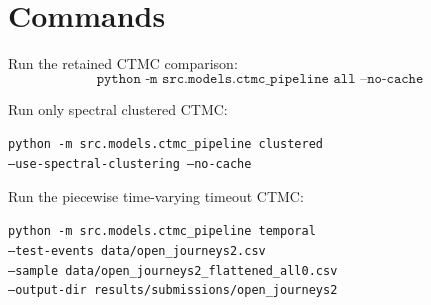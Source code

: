 \documentclass[11pt]{article}
\begin{document}
\section{Commands}

Run the retained CTMC comparison:
\[
\texttt{python -m src.models.ctmc\_pipeline all --no-cache}
\]

Run only spectral clustered CTMC:
\begin{flushleft}
\texttt{python -m src.models.ctmc\_pipeline clustered}\\
\texttt{\quad --use-spectral-clustering --no-cache}
\end{flushleft}

Run the piecewise time-varying timeout CTMC:
\begin{flushleft}
\texttt{python -m src.models.ctmc\_pipeline temporal}\\
\texttt{\quad --test-events data/open\_journeys2.csv}\\
\texttt{\quad --sample data/open\_journeys2\_flattened\_all0.csv}\\
\texttt{\quad --output-dir results/submissions/open\_journeys2}
\end{flushleft}
\end{document}
